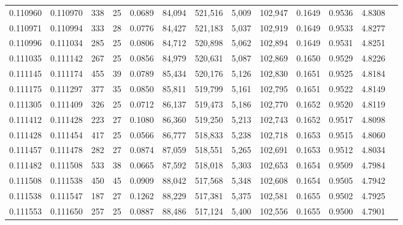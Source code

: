 \begin{tabular}{rrrrrrrrrrrrr}
0.110960 & 0.110970 &   338 &  25 &                                     0.0689 &  84,094 & 521,516 &   5,009 & 102,947 & 0.1649 & 0.9536 & 4.8308 \\
0.110971 & 0.110994 &   333 &  28 &                                     0.0776 &  84,427 & 521,183 &   5,037 & 102,919 & 0.1649 & 0.9533 & 4.8277 \\
0.110996 & 0.111034 &   285 &  25 &                                     0.0806 &  84,712 & 520,898 &   5,062 & 102,894 & 0.1649 & 0.9531 & 4.8251 \\
0.111035 & 0.111142 &   267 &  25 &                                     0.0856 &  84,979 & 520,631 &   5,087 & 102,869 & 0.1650 & 0.9529 & 4.8226 \\
0.111145 & 0.111174 &   455 &  39 &                                     0.0789 &  85,434 & 520,176 &   5,126 & 102,830 & 0.1651 & 0.9525 & 4.8184 \\
0.111175 & 0.111297 &   377 &  35 &                                     0.0850 &  85,811 & 519,799 &   5,161 & 102,795 & 0.1651 & 0.9522 & 4.8149 \\
0.111305 & 0.111409 &   326 &  25 &                                     0.0712 &  86,137 & 519,473 &   5,186 & 102,770 & 0.1652 & 0.9520 & 4.8119 \\
0.111412 & 0.111428 &   223 &  27 &                                     0.1080 &  86,360 & 519,250 &   5,213 & 102,743 & 0.1652 & 0.9517 & 4.8098 \\
0.111428 & 0.111454 &   417 &  25 &                                     0.0566 &  86,777 & 518,833 &   5,238 & 102,718 & 0.1653 & 0.9515 & 4.8060 \\
0.111457 & 0.111478 &   282 &  27 &                                     0.0874 &  87,059 & 518,551 &   5,265 & 102,691 & 0.1653 & 0.9512 & 4.8034 \\
0.111482 & 0.111508 &   533 &  38 &                                     0.0665 &  87,592 & 518,018 &   5,303 & 102,653 & 0.1654 & 0.9509 & 4.7984 \\
0.111508 & 0.111538 &   450 &  45 &                                     0.0909 &  88,042 & 517,568 &   5,348 & 102,608 & 0.1654 & 0.9505 & 4.7942 \\
0.111538 & 0.111547 &   187 &  27 &                                     0.1262 &  88,229 & 517,381 &   5,375 & 102,581 & 0.1655 & 0.9502 & 4.7925 \\
0.111553 & 0.111650 &   257 &  25 &                                     0.0887 &  88,486 & 517,124 &   5,400 & 102,556 & 0.1655 & 0.9500 & 4.7901 \\

\end{tabular}
